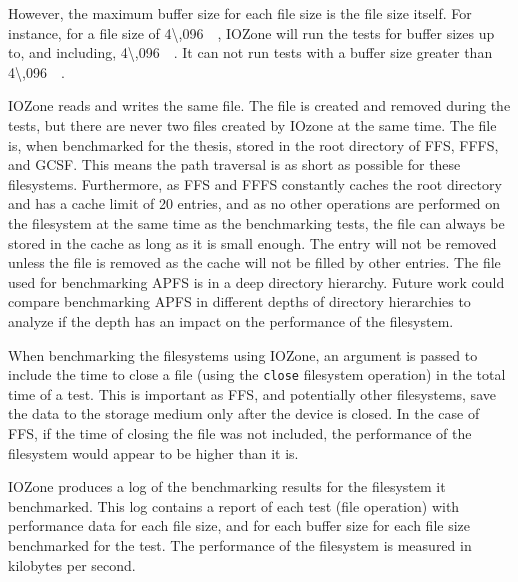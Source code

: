 However, the maximum buffer size for each file size is the file size itself. For instance, for a file size of \SI{4\,096}{\kilo\byte}, IOZone will run the tests for buffer sizes up to, and including, \SI{4\,096}{\kilo\byte}. It can not run tests with a buffer size greater than \SI{4\,096}{\kilo\byte}.

IOZone reads and writes the same file. The file is created and removed during the tests, but there are never two files created by IOzone at the same time. The file is, when benchmarked for the thesis, stored in the root directory of \gls{FFS}, \gls{FFFS}, and \gls{GCSF}. This means the path traversal is as short as possible for these filesystems. Furthermore, as \gls{FFS} and \gls{FFFS} constantly caches the root directory and has a cache limit of 20 entries, and as no other operations are performed on the filesystem at the same time as the benchmarking tests, the file can always be stored in the cache as long as it is small enough. The entry will not be removed unless the file is removed as the cache will not be filled by other entries. The file used for benchmarking \gls{APFS} is in a deep directory hierarchy. Future work could compare benchmarking \gls{APFS} in different depths of directory hierarchies to analyze if the depth has an impact on the performance of the filesystem.

When benchmarking the filesystems using IOZone, an argument is passed to include the time to close a file (using the \texttt{close} filesystem operation) in the total time of a test. This is important as \gls{FFS}, and potentially other filesystems, save the data to the storage medium only after the device is closed. In the case of \gls{FFS}, if the time of closing the file was not included, the performance of the filesystem would appear to be higher than it is.

IOZone produces a log of the benchmarking results for the filesystem it benchmarked. This log contains a report of each test (file operation) with performance data for each file size, and for each buffer size for each file size benchmarked for the test. The performance of the filesystem is measured in kilobytes per second.

